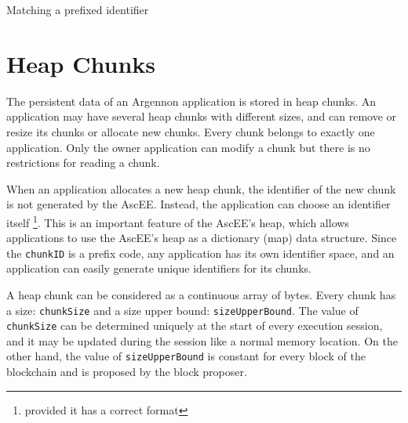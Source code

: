 \begin{algorithm}[h]
    \DontPrintSemicolon
    \BlankLine
    \BlankLine
    {
        {
            \;
        }
    }
    \;
    \caption{Matching a prefixed identifier}\label{alg:match_id}
\end{algorithm}


\section{Heap Chunks}\label{heap}

The persistent data of an Argennon application is stored in heap chunks. An application may have several heap chunks
with different sizes, and can remove or
resize its chunks or allocate new chunks. Every chunk belongs to exactly one application. Only the owner application can
modify a chunk but there is no restrictions for reading a chunk.

When an application allocates a new heap chunk, the identifier of the new chunk is not generated by
the AscEE. Instead, the application can choose an identifier itself \footnote{provided it has a correct format}. This
is an important feature of the AscEE's heap, which allows applications to use the AscEE's heap as a dictionary (map)
data structure.
Since the \texttt{chunkID} is a prefix code, any application has its own identifier space, and an application
can easily generate unique identifiers for its chunks.

A heap chunk can be considered as a continuous
array of bytes. Every chunk has a size: \texttt{chunkSize} and a size upper bound: \texttt{sizeUpperBound}. The value of
\texttt{chunkSize} can be determined uniquely at
the start of
every execution session, and it may be updated during the session like a normal memory location. On the other hand,
the value of \texttt{sizeUpperBound} is constant for every block of the blockchain and is proposed by the block
proposer.

